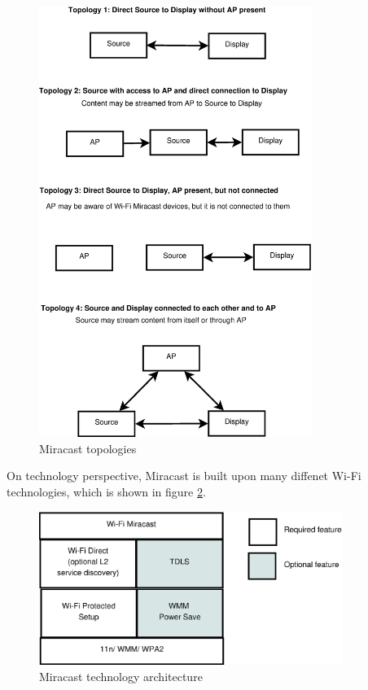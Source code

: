 \begin{figure}[htb] \centering 
\includegraphics[height=14cm]{charts/miracast_model} 
\caption{Miracast topologies \label{miracast_model}} 
\end{figure} 

On technology perspective, Miracast is built upon many diffenet Wi-Fi 
technologies, which is shown in figure \ref{miracast_architect}. 

\begin{figure}[htb] \centering 
\includegraphics[height=5cm]{charts/miracast_technology_architecture} 
\caption{Miracast technology architecture \label{miracast_architect}} 
\end{figure} 

